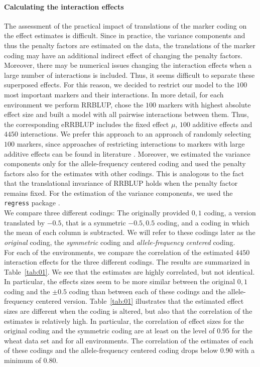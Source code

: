 \documentclass{bmcart}
\newcommand{\0}{\mathbf{0}}
\begin{document}
\paragraph{Calculating the interaction effects} 
The assessment of the practical impact of translations of the marker coding on the effect estimates is difficult. 
Since in practice, the variance components and thus the penalty factors are estimated on the data, the translations of the marker coding may have an additional indirect effect of changing the penalty factors. Moreover, there may be numerical issues changing the interaction effects when a large number of interactions is included.
Thus, it seems difficult to separate these superposed effects. For this reason, we decided to restrict our model to the $100$ most important markers and their interactions. In more detail, for each environment we perform RRBLUP, chose the $100$ markers with highest absolute effect size and built a model with all pairwise interactions between them. Thus, the corresponding eRRBLUP includes the fixed effect $\mu$, $100$ additive effects and $4450$ interactions. We prefer this approach to an approach of randomly selecting $100$ markers, since approaches of restricting interactions to markers with large additive effects can be found in literature \cite{karkkainen2015efficient}. Moreover, we estimated the variance components only for the allele-frequency centered coding and used the penalty factors also for the estimates with other codings. This is analogous to the fact that the translational invariance of RRBLUP holds when the penalty factor remains fixed. For the estimation of the variance components, we used the \texttt{regress} package \cite{clifford2014regress}.\\

We compare three different codings: The originally provided ${0,1}$ coding, a version translated by $-0.5$, that is a symmetric $-0.5, 0.5$ coding, and a coding in which the mean of each column is subtracted. We will refer to these codings later as the \emph{original} coding, the \emph{symmetric} coding and \emph{allele-frequency centered} coding. \\

For each of the environments, we compare the correlation of the estimated $4450$ interaction effects for the three different codings. The results are summarized in Table~\ref{tab:01}. 
We see that the estimates are highly correlated, but not identical. In particular, the effects sizes seem to be more similar between the original $0,1$ coding and the $\pm 0.5$ coding than between each of these codings and the allele-frequency centered version.
Table~\ref{tab:01} illustrates that the estimated effect sizes are different when the coding is altered, but also that the correlation of the estimates is relatively high.
In particular, the correlation of effect sizes for the original coding and the symmetric coding are at least on the level of $0.95$ for the wheat data set and for all environments. 
The correlation of the estimates of each of these codings and the allele-frequency centered coding drops below $0.90$ with a minimum of $0.80$. 
\end{document}
